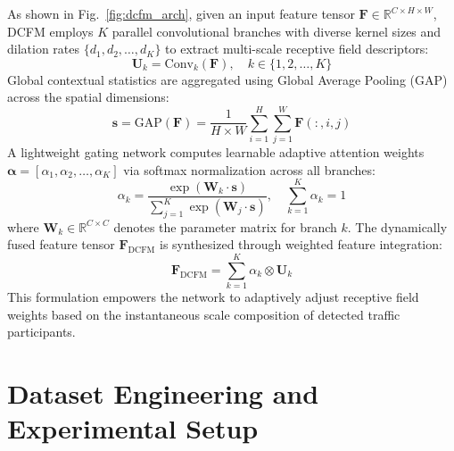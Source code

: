 \documentclass[pdflatex,sn-mathphys]{sn-jnl}
\begin{document}
As shown in Fig.~\ref{fig:dcfm_arch}, given an input feature tensor $\mathbf{F} \in \mathbb{R}^{C \times H \times W}$, DCFM employs $K$ parallel convolutional branches with diverse kernel sizes and dilation rates $\{d_1, d_2, \dots, d_K\}$ to extract multi-scale receptive field descriptors:
\begin{equation}
\mathbf{U}_k = \text{Conv}_k(\mathbf{F}), \quad k \in \{1, 2, \dots, K\}
\end{equation}
Global contextual statistics are aggregated using Global Average Pooling (GAP) across the spatial dimensions:
\begin{equation}
\mathbf{s} = \text{GAP}(\mathbf{F}) = \frac{1}{H \times W} \sum_{i=1}^{H} \sum_{j=1}^{W} \mathbf{F}(:, i, j)
\end{equation}
A lightweight gating network computes learnable adaptive attention weights $\boldsymbol{\alpha} = [\alpha_1, \alpha_2, \dots, \alpha_K]$ via softmax normalization across all branches:
\begin{equation}
\alpha_k = \frac{\exp(\mathbf{W}_k \cdot \mathbf{s})}{\sum_{j=1}^{K} \exp(\mathbf{W}_j \cdot \mathbf{s})}, \quad \sum_{k=1}^{K} \alpha_k = 1
\label{eq:dcfm_gate}
\end{equation}
where $\mathbf{W}_k \in \mathbb{R}^{C \times C}$ denotes the parameter matrix for branch $k$. The dynamically fused feature tensor $\mathbf{F}_{\text{DCFM}}$ is synthesized through weighted feature integration:
\begin{equation}
\mathbf{F}_{\text{DCFM}} = \sum_{k=1}^{K} \alpha_k \otimes \mathbf{U}_k
\label{eq:dcfm_fuse}
\end{equation}
This formulation empowers the network to adaptively adjust receptive field weights based on the instantaneous scale composition of detected traffic participants.

\section{Dataset Engineering and Experimental Setup}\label{sec:dataset}
\end{document}
